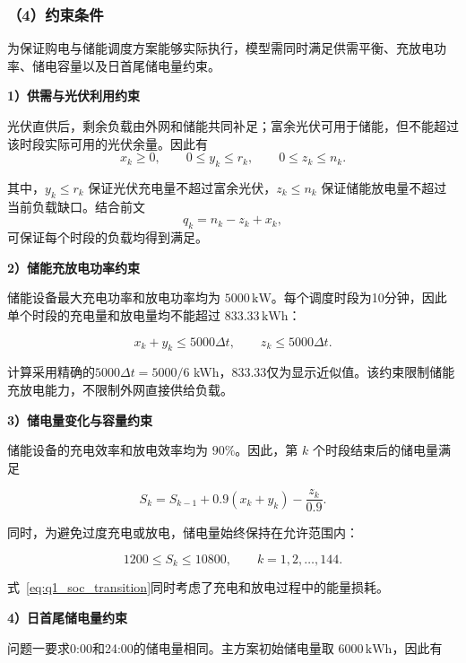 \subsubsection*{（4）约束条件}

为保证购电与储能调度方案能够实际执行，模型需同时满足供需平衡、充放电功率、储电容量以及日首尾储电量约束。

\textbf{1）供需与光伏利用约束}

光伏直供后，剩余负载由外网和储能共同补足；富余光伏可用于储能，但不能超过该时段实际可用的光伏余量。因此有
\begin{equation}
x_k\geq 0,\qquad
0\leq y_k\leq r_k,\qquad
0\leq z_k\leq n_k.
\label{eq:q1_supply_constraint}
\end{equation}

其中，\(y_k\leq r_k\) 保证光伏充电量不超过富余光伏，\(z_k\leq n_k\) 保证储能放电量不超过当前负载缺口。结合前文
\[
q_k=n_k-z_k+x_k,
\]
可保证每个时段的负载均得到满足。

\textbf{2）储能充放电功率约束}

储能设备最大充电功率和放电功率均为 \(5000\,\mathrm{kW}\)。每个调度时段为10分钟，因此单个时段的充电量和放电量均不能超过 \(833.33\,\mathrm{kWh}\)：

\begin{equation}
x_k+y_k\leq5000\Delta t,\qquad
z_k\leq5000\Delta t.
\label{eq:q1_power_constraint}
\end{equation}

计算采用精确的$5000\Delta t=5000/6$ kWh，833.33仅为显示近似值。该约束限制储能充放电能力，不限制外网直接供给负载。

\textbf{3）储电量变化与容量约束}

储能设备的充电效率和放电效率均为 \(90\%\)。因此，第 \(k\) 个时段结束后的储电量满足

\begin{equation}
S_k
=
S_{k-1}
+0.9(x_k+y_k)
-\frac{z_k}{0.9}.
\label{eq:q1_soc_transition}
\end{equation}

同时，为避免过度充电或放电，储电量始终保持在允许范围内：

\begin{equation}
1200\leq S_k\leq10800,
\qquad k=1,2,\ldots,144.
\label{eq:q1_soc_bound}
\end{equation}

式~\eqref{eq:q1_soc_transition}同时考虑了充电和放电过程中的能量损耗。

\textbf{4）日首尾储电量约束}

问题一要求0:00和24:00的储电量相同。主方案初始储电量取 \(6000\,\mathrm{kWh}\)，因此有

